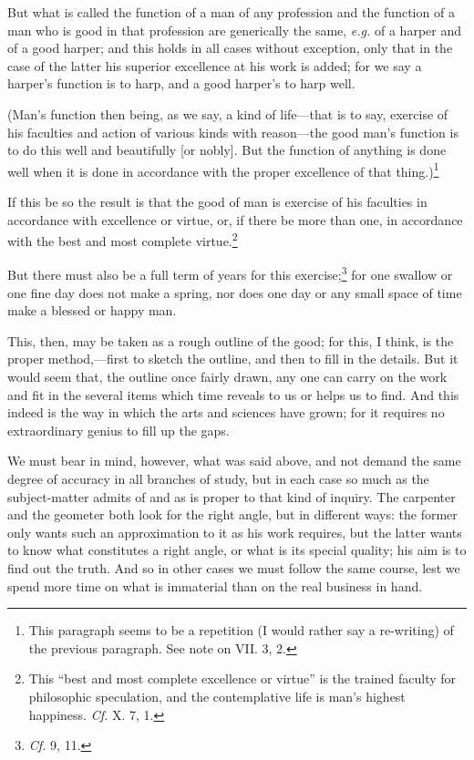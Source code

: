 But what is called the function of a man of any profession and the
function of a man who is good in that profession are generically the
same, \textit{e.g.} of a harper and of a good harper; and this holds
in all cases without exception, only that in the case of the latter
his superior excellence at his work is added; for we say a harper's
function is to harp, and a good harper's to harp well.

(Man's function then being, as we say, a kind of life---that is to
say, exercise of his faculties and action of various kinds with
reason---the good man's function is to do this well and beautifully
[or nobly]. But the function of anything is done well when it is done
in accordance with the proper excellence of that thing.)\footnote{This
paragraph seems to be a repetition (I would rather say a re-writing)
of the previous paragraph. See note on VII. 3, 2.}

If this be so the result is that the good of man is exercise
of his faculties in accordance with excellence or virtue, or, if there
be more than one, in accordance with the best and most complete
virtue.\footnote{This ``best and most complete excellence or virtue''
is the trained faculty for philosophic speculation, and the
contemplative life is man's highest happiness. \textit{Cf.} X. 7, 1.}

But there must also be a full term of years for this
exercise;\footnote{\textit{Cf.} 9, 11.} for one swallow or one fine
day does not make a spring, nor does one day or any small space of
time make a blessed or happy man.

This, then, may be taken as a rough outline of the good; for this, I
think, is the proper method,---first to sketch the outline, and then
to fill in the details. But it would seem that, the outline once
fairly drawn, any one can carry on the work and fit in the several
items which time reveals to us or helps us to find. And this indeed is
the way in which the arts and sciences have grown; for it requires no
extraordinary genius to fill up the gaps.

We must bear in mind, however, what was said above, and not demand the
same degree of accuracy in all branches of study, but in each case so
much as the subject-matter admits of and as is proper to that kind of
inquiry. The carpenter and the geometer both look for the right angle,
but in different ways: the former only wants such an approximation to
it as his work requires, but the latter wants to know what constitutes
a right angle, or what is its special quality; his aim is to find out
the truth. And so in other cases we must follow the same course, lest
we spend more  time on what is immaterial than on the real
business in hand.

